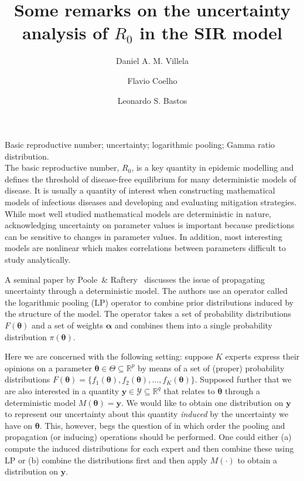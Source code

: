 \documentclass[11pt]{article}
\title{Some remarks on the uncertainty analysis of $R_0$ in the SIR model}
\author[1]{Daniel A. M. Villela}
\author[3]{Flavio Coelho}
\author[1]{Leonardo S. Bastos}
\affil[2]{Institute of Evolutionary Biology, University of Edinburgh, United Kingdom} %
\affil[3]{School of Applied Mathematics, Getulio Vargas Foundation (FGV), Brazil,\,\emailaddress{fccoelho@fgv.br}} %
\date{\vspace{-6ex}} %
\newcommand{\keywords}[1]{\noindent{\large{\bf Keywords:}} #1\\}
\begin{document}
\maketitle

\keywords{Basic reproductive number; uncertainty; logarithmic pooling; Gamma ratio distribution.}

The basic reproductive number, $R_0$, is a key quantity in epidemic modelling and defines the threshold of disease-free equilibrium for many deterministic models of disease.
It is usually a quantity of interest when constructing mathematical models of infectious diseases and developing and evaluating mitigation strategies.
While most well studied mathematical models are deterministic in nature, acknowledging uncertainty on parameter values is important because predictions can be sensitive to changes in parameter values.
In addition, most interesting models are nonlinear which makes correlations between parameters difficult to study analytically.

A seminal paper by Poole~\& Raftery~\cite{poole2000} discusses the issue of propagating uncertainty through a deterministic model.
The authors use an operator called the logarithmic pooling (LP) operator to combine prior distributions induced by the structure of the model.
The operator takes a set of probability distributions $F(\boldsymbol\theta)$ and a set of weights $\boldsymbol\alpha$ and combines them into a single probability distribution $\pi(\boldsymbol\theta)$.

Here we are concerned with the following setting: suppose $K$ experts express their opinions on a parameter $\boldsymbol\theta \in \Theta \subseteq \mathbb{R}^{p}$ by means of a set of (proper) probability distributions $F(\boldsymbol\theta) = \{ f_1(\boldsymbol\theta), f_2(\boldsymbol\theta), \ldots, f_K(\boldsymbol\theta) \}$.
Supposed further that we are also interested in a quantity $\mathbf{y} \in  \mathcal{Y}  \subseteq \mathbb{R}^{q}$ that relates to $\boldsymbol\theta $ through a deterministic model $M(\boldsymbol\theta) = \mathbf{y}$.
We would like to obtain one distribution on $\mathbf{y}$ to represent our uncertainty about this quantity \textit{induced} by the uncertainty we have on $\boldsymbol\theta$.
This, however, begs the question of in which order the pooling and propagation (or inducing) operations should be performed.
One could either (a) compute the induced distributions for each expert and then combine these using LP or (b) combine the distributions first and then apply $M(\cdot)$ to obtain a distribution on $\mathbf{y}$.
\end{document}
